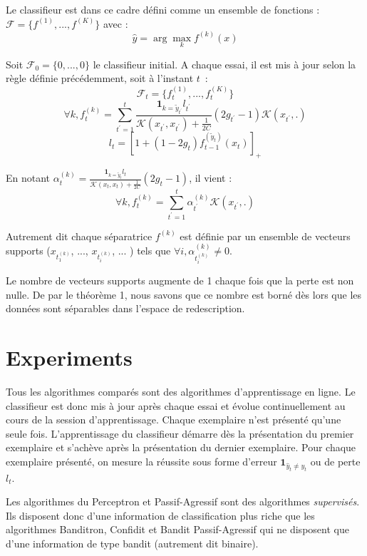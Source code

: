 \documentclass[preprint,12pt,authoryear]{elsarticle}
\begin{document}
Le classifieur est dans ce cadre défini comme un ensemble de fonctions : $\mathcal{F} = \{f^{(1)}, ..., f^{(K)}\}$ avec :
$$\hat{y} = \arg \max_k f^{(k)}(x)$$

Soit $\mathcal{F}_0=\{0, ..., 0\}$ le classifieur initial. A chaque essai, il est mis à jour selon la règle définie précédemment, soit à l'instant $t$~:
$$\mathcal{F}_t = \{f^{(1)}_t, ..., f^{(K)}_t\}$$
$$\forall k, f^{(k)}_t = \sum_{t^\prime = 1} ^t  \frac {\mathbf{1}_{k=\tilde{y}_{t^\prime}}l_{t^\prime}}{\mathcal{K}(x_{t^\prime},x_{t^\prime})+\frac{1}{2C}} (2g_{t^\prime} - 1)\mathcal{K}(x_{t^\prime},.)$$
$$ l_t = [1 + (1-2g_t) f_{t-1}^{(\tilde{y}_t)}(x_t)]_+$$

En notant $\alpha_t^{(k)} = \frac {\mathbf{1}_{k=\tilde{y}_{t}}l_{t}}{\mathcal{K}(x_{t},x_{t})+\frac{1}{2C}} (2g_{t} - 1)$, il vient :
$$\forall k, f^{(k)}_t = \sum_{t^\prime = 1} ^t \alpha_{t^\prime}^{(k)} \mathcal{K}(x_{t^\prime},.)$$

Autrement dit chaque séparatrice $f^{(k)}$ est définie par un ensemble de vecteurs supports ($x_{t_1^{(k)}}$, ..., $x_{t_i^{(k)}}$, ...  ) tels que $\forall i, \alpha_{t_i^{(k)}}^{(k)} \neq 0$.


Le nombre de vecteurs supports augmente de 1 chaque fois que la perte est non nulle. De par le théorème 1, nous savons que ce nombre est borné dès lors que les données sont séparables dans l'espace de redescription. 





\section{Experiments}

Tous les algorithmes comparés sont des algorithmes d'apprentissage en ligne. Le classifieur est donc mis à jour après chaque essai et évolue continuellement au cours de la session d'apprentissage. Chaque exemplaire n'est présenté qu'une seule fois. L'apprentissage du classifieur démarre dès la présentation du premier exemplaire et s'achève après la présentation du dernier exemplaire. Pour chaque exemplaire présenté, on mesure la réussite sous forme d'erreur $\mathbf{1}_{\hat{y}_t\neq y_t}$ ou de perte $l_t$. 

Les algorithmes du Perceptron et Passif-Agressif sont des algorithmes \emph{supervisés}. Ils disposent donc d'une information de classification plus riche que les algorithmes Banditron, Confidit et Bandit Passif-Agressif qui ne disposent que d'une information de type bandit (autrement dit binaire).
\end{document}
